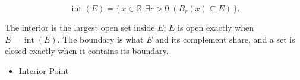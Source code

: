 \begin{remark*}
\[
\operatorname{int}(E)=\{\,x\in\mathbb{R}: \exists r>0\;(B_r(x)\subseteq E)\,\}.
\]
\end{remark*}
\begin{remark*}[Interpretation]
The interior is the largest open set inside $E$; $E$ is open exactly when $E=\operatorname{int}(E)$. The boundary is what $E$ and its complement share, and a set is closed exactly when it contains its boundary.
\end{remark*}
\begin{dependencies}
\begin{itemize}
  \item \hyperref[def:interior-point]{Interior Point}
\end{itemize}
\end{dependencies}
